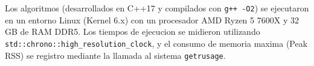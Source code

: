 Los algoritmos (desarrollados en C++17 y compilados con \texttt{g++ -O2}) se ejecutaron en un entorno Linux (Kernel 6.x) 
con un procesador AMD Ryzen 5 7600X y 32 GB de RAM DDR5. Los tiempos de ejecucion se midieron utilizando
 \texttt{std::chrono::high\_resolution\_clock}, y el consumo de memoria maxima (Peak RSS) se registro mediante la llamada al sistema \texttt{getrusage}.